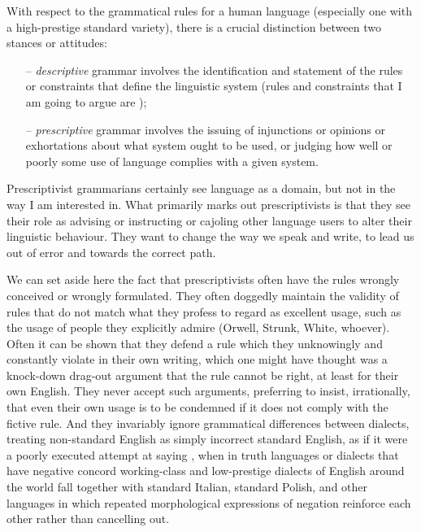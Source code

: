 \documentclass[output=paper]{langscibook}
\begin{document}
\largerpage[1]With respect to the grammatical rules for a human language (especially one with a high-prestige standard variety), there is a crucial distinction between two stances or attitudes:

\begin{itemize} 
\item[--] \emph{descriptive} grammar involves the identification and statement of the rules or constraints that define the linguistic system (rules and constraints that I am going to argue are ); 
\item[--] \emph{prescriptive} grammar involves the issuing of injunctions or opinions or exhortations about what system ought to be used, or judging how well or poorly some use of language complies with a given system. 
\end{itemize} 

Prescriptivist grammarians certainly see language as a  domain, but not in the way I am interested in. What primarily marks out prescriptivists is that they see their role as advising or instructing or cajoling other language users to alter their linguistic behaviour.  They want to change the way we speak and write, to lead us out of error and towards the correct path.

We can set aside here the fact that prescriptivists often have the rules wrongly conceived or wrongly formulated.  They often doggedly maintain the validity of rules that do not match what they profess to regard as excellent usage, such as the usage of people they explicitly admire (Orwell, Strunk, White, whoever).  Often it can be shown that they defend a rule which they unknowingly and constantly violate in their own writing, which one might have thought was a knock-down drag-out argument that the rule cannot be right, at least for their own English.  They never accept such arguments, preferring to insist, irrationally, that even their own usage is to be condemned if it does not comply with the fictive rule. And they invariably ignore grammatical differences between dialects, treating non-standard English  as simply incorrect standard English, as if it were a poorly executed attempt at saying , when in truth languages or dialects that have negative concord working-class and low-prestige dialects of English around the world fall together with standard Italian, standard Polish, and other languages in which repeated morphological expressions of negation reinforce each other rather than cancelling out.
\end{document}
